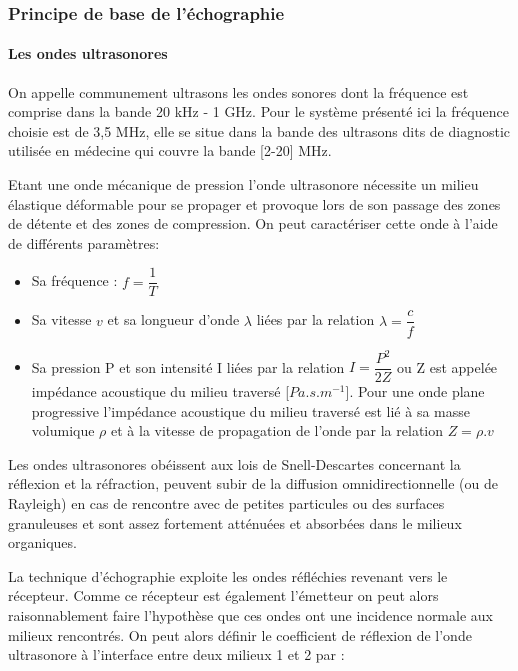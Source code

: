\documentclass[12pt]{article}
\begin{document}
\subsubsection{Principe de base de l'échographie}

\paragraph{Les ondes ultrasonores}
On appelle communement ultrasons les ondes sonores dont la fréquence est comprise dans la bande 20 kHz - 1 GHz. Pour le système présenté ici la fréquence choisie est de 3,5 MHz, elle se situe dans la bande des ultrasons dits de diagnostic utilisée en médecine qui couvre la bande [2-20] MHz.\par
Etant une onde mécanique de pression l'onde ultrasonore nécessite un milieu élastique déformable pour se propager et provoque lors de son passage des zones de détente et des zones de compression. On peut caractériser cette onde à l'aide de différents paramètres:\par
\vspace{10pt}

\begin{itemize}
\item Sa fréquence : $f = \dfrac{1}{T}$
\item Sa vitesse $v$ et sa longueur d'onde  $\lambda $ liées par la relation $\lambda = \dfrac{c}{f}$
\item Sa pression P et son intensité I liées par la relation $I = \dfrac{P^2}{2Z}$ ou Z est appelée impédance acoustique du milieu traversé [$Pa.s.m^{-1}$]. Pour une onde plane progressive l'impédance acoustique du milieu traversé est lié à sa masse volumique $\rho$ et à la vitesse de propagation de l'onde par la relation $Z = \rho .v$
\end{itemize}
\vspace{10pt}
Les ondes ultrasonores obéissent aux lois de Snell-Descartes concernant la réflexion et la réfraction, peuvent subir de la diffusion omnidirectionnelle (ou de Rayleigh) en cas de rencontre avec de petites particules ou des surfaces granuleuses et sont assez fortement atténuées et absorbées dans le milieux organiques.\par
\vspace{10pt}

La technique d'échographie exploite les ondes réfléchies revenant vers le récepteur. Comme ce récepteur est également l'émetteur on peut alors raisonnablement faire l'hypothèse que ces ondes ont une incidence normale aux milieux rencontrés. On peut alors définir le coefficient de réflexion de l'onde ultrasonore à l'interface entre deux milieux 1 et 2 par :
\end{document}
